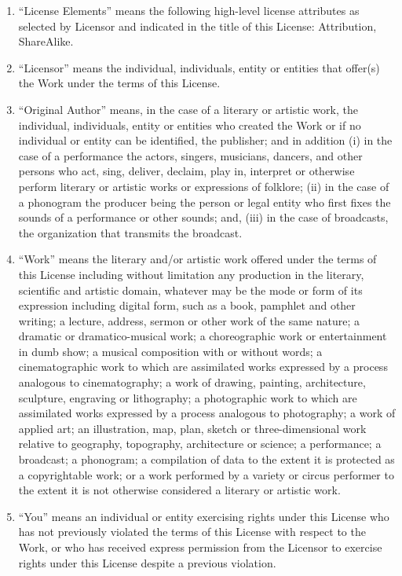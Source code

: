 \documentclass[letterpaper,10pt,english]{manual}
\begin{document}
\begin{enumerate}
\begin{enumerate}
\item {} 
``License Elements'' means the following high-level license attributes as selected by Licensor and indicated in the title of this License: Attribution, ShareAlike.

\item {} 
``Licensor'' means the individual, individuals, entity or entities that offer(s) the Work under the terms of this License.

\item {} 
``Original Author'' means, in the case of a literary or artistic work, the individual, individuals, entity or entities who created the Work or if no individual or entity can be identified, the publisher; and in addition (i) in the case of a performance the actors, singers, musicians, dancers, and other persons who act, sing, deliver, declaim, play in, interpret or otherwise perform literary or artistic works or expressions of folklore; (ii) in the case of a phonogram the producer being the person or legal entity who first fixes the sounds of a performance or other sounds; and, (iii) in the case of broadcasts, the organization that transmits the broadcast.

\item {} 
``Work'' means the literary and/or artistic work offered under the terms of this License including without limitation any production in the literary, scientific and artistic domain, whatever may be the mode or form of its expression including digital form, such as a book, pamphlet and other writing; a lecture, address, sermon or other work of the same nature; a dramatic or dramatico-musical work; a choreographic work or entertainment in dumb show; a musical composition with or without words; a cinematographic work to which are assimilated works expressed by a process analogous to cinematography; a work of drawing, painting, architecture, sculpture, engraving or lithography; a photographic work to which are assimilated works expressed by a process analogous to photography; a work of applied art; an illustration, map, plan, sketch or three-dimensional work relative to geography, topography, architecture or science; a performance; a broadcast; a phonogram; a compilation of data to the extent it is protected as a copyrightable work; or a work performed by a variety or circus performer to the extent it is not otherwise considered a literary or artistic work.

\item {} 
``You'' means an individual or entity exercising rights under this License who has not previously violated the terms of this License with respect to the Work, or who has received express permission from the Licensor to exercise rights under this License despite a previous violation.


\end{enumerate}
\end{enumerate}
\end{document}
